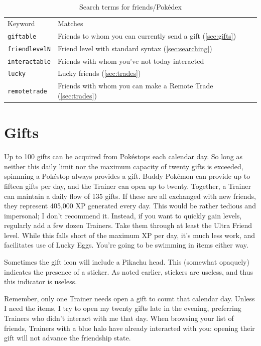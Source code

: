\begin{table}
\centering\small
\begin{tabular}{ll}
Keyword & Matches \\
\Midrule
\texttt{giftable} & Friends to whom you can currently send a gift (\autoref{sec:gifts})\\
\texttt{friendlevelN} & Friend level with standard syntax (\autoref{sec:searching})\\
\texttt{interactable} & Friends with whom you've not today interacted \\
\texttt{lucky} & Lucky friends (\autoref{sec:trades})\\
  \texttt{remotetrade} & Friends with whom you can make a Remote Trade (\autoref{sec:trades})\\
\end{tabular}
\caption{Search terms for friends/Pokédex\label{table:searchtermsfriends}}
\end{table}

\section{Gifts\label{sec:gifts}}
Up to 100 gifts can be acquired from Pokéstops each calendar day.
So long as neither this daily limit nor the maximum capacity of twenty gifts
 is exceeded, spinnning a Pokéstop always provides a gift.
Buddy Pokémon can provide up to fifteen gifts per day,
  and the Trainer can open up to twenty.
Together, a Trainer can maintain a daily flow of 135 gifts.
If these are all exchanged with new friends, they represent 405,000 XP generated every day.
This would be rather tedious and impersonal; I don't recommend it.
Instead, if you want to quickly gain levels, regularly add a few dozen Trainers.
Take them through at least the Ultra Friend level.
While this falls short of the maximum XP per day, it's much less work, and facilitates use of Lucky Eggs.
You're going to be swimming in items either way.

\begin{tipbox}[title=What's that Pikachu?]
Sometimes the gift icon will include a Pikachu head.
This (somewhat opaquely) indicates the presence of a sticker.
As noted earlier, stickers are useless, and thus this indicator is useless.
\end{tipbox}

Remember, only one Trainer needs open a gift to count that calendar day.
Unless I need the items, I try to open my twenty gifts late in the evening,
  preferring Trainers who didn't interact with me that day.
When browsing your list of friends, Trainers with a blue halo have already interacted with you:
  opening their gift will not advance the friendship state.

